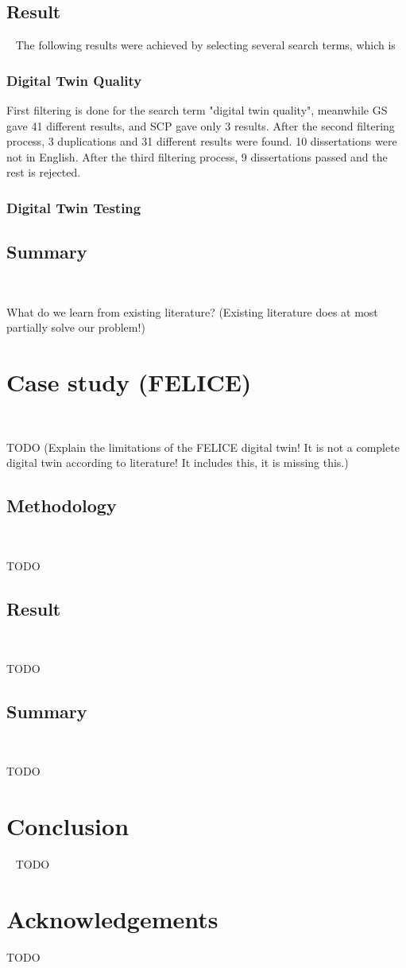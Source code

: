 \documentclass[9pt,conference]{IEEEtran}
\begin{document}
    
    \subsection{Result}~\label{section:liteature_result}
    The following results were achieved by selecting several  search terms, which is 
    \subsubsection*{Digital Twin Quality}\label{subsection:Digital Twin Quality}
    
    First filtering is done for the search term "digital twin quality", meanwhile GS gave 41 different results, and SCP gave only 3 results.
    After the second filtering process, 3 duplications and 31 different results were found. 10 dissertations were not in English.
    After the third filtering process, 9 dissertations passed and the rest is rejected.

    \subsubsection*{Digital Twin Testing}\label{subsection:Digital Twin Quality}

    \subsection{Summary}~\label{section:liteature_summary}

    What do we learn from existing literature?
    (Existing literature does at most partially solve our problem!)

    \section{Case study (FELICE)}~\label{section:case}

    TODO (Explain the limitations of the FELICE digital twin! It is not a complete digital twin according to literature! It includes this, it is missing this.)

    \subsection{Methodology}~\label{section:case_methodology}

    TODO

    \subsection{Result}~\label{section:case_result}

    TODO

    \subsection{Summary}~\label{section:case_summary}

    TODO

    \section{Conclusion}~\label{section:conclusion}
    TODO

    \section*{Acknowledgements}
    TODO

    
    
\end{document}
